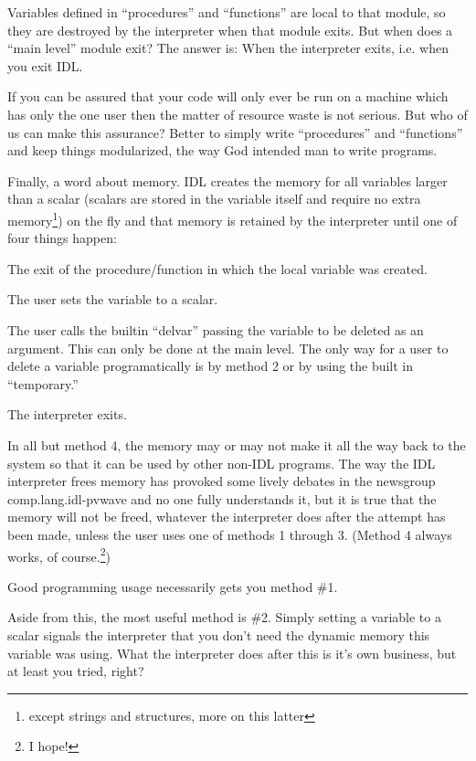     Variables defined in ``procedures'' and ``functions'' are
    local to that module, so they are destroyed by the interpreter
    when that module exits. But when does a ``main level'' module
    exit? The answer is: When the interpreter exits, i.e. when you
    exit IDL.


    If you can be assured that your code will only ever be run on a 
    machine which has only the one user then the matter of resource
    waste is not serious. But who of us can make this assurance?
    Better to simply write ``procedures'' and ``functions'' and keep
    things modularized, the way God intended man to write programs.

    Finally, a word about memory. IDL creates the memory for all
    variables larger than a scalar (scalars are stored in the variable
    itself and require no extra memory\footnote{except strings and
    structures, more on this latter}) on the fly and that memory is
    retained by the interpreter until one of four things happen:

    \be
	\item The exit of the procedure/function in which the local
              variable was created.
	\item The user sets the variable to a scalar.
	\item The user calls the builtin ``delvar'' passing the
	      variable to be deleted as an argument. This can only be
	      done at the main level. The only way for a user to
	      delete a variable programatically is by method 2 or by
	      using the built in ``temporary.''
        \item The interpreter exits.
    \ee

     In all but method 4, the memory may or may not make it all the
     way back to the system so that it can be used by other non-IDL
     programs. The way the IDL interpreter frees memory has provoked
     some lively debates in the newsgroup comp.lang.idl-pvwave and no
     one fully understands it, but it is true  that the
     memory will not be freed, whatever the interpreter does after the
     attempt has been made, unless the user uses one of methods 1
     through 3. (Method 4 always works, of course.\footnote{I hope!})

     Good programming usage necessarily gets you method \#1.

     Aside from this, the most useful method is \#2. Simply setting a
     variable to a scalar signals the interpreter that you don't need
     the dynamic memory this variable was using. What the interpreter
     does after this is it's own business, but at least you tried,
     right?

